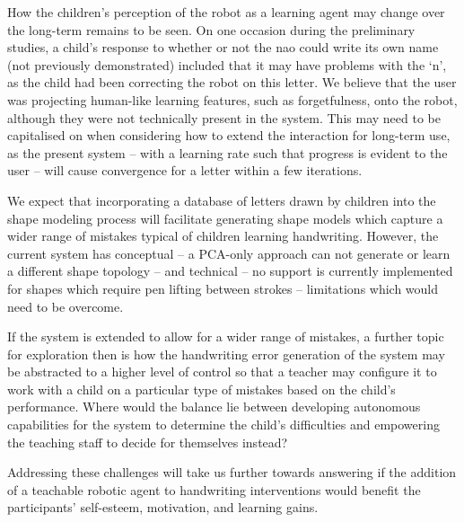 \documentclass{sig-alternate}
\begin{document}
How the children's perception of the robot as a learning agent may change over
the long-term remains to be seen. On one occasion during the preliminary
studies, a child's response to whether or not the {\sc nao} could write its own
name (not previously demonstrated) included that it may have problems with the
`n', as the child had been correcting the robot on this letter. We believe that
the user was projecting human-like learning features, such as forgetfulness,
onto the robot, although they were not technically present in the system.  This
may need to be capitalised on when considering how to extend the interaction for
long-term use, as the present system -- with a learning rate such that progress
is evident to the user -- will cause convergence for a letter within a few
iterations.

We expect that incorporating a database of letters drawn by children into the
shape modeling process will facilitate generating shape models which capture a
wider range of mistakes typical of children learning handwriting. However, the
current system has conceptual -- a PCA-only approach can not generate or learn a
different shape topology -- and technical -- no support is currently implemented
for shapes which require pen lifting between strokes -- limitations which would
need to be overcome.

If the system is extended to allow for a wider range of mistakes, a further
topic for exploration then is how the handwriting error generation of the system
may be abstracted to a higher level of control so that a teacher may configure
it to work with a child on a particular type of mistakes based on the child's
performance. Where would the balance lie between developing autonomous
capabilities for the system to determine the child's difficulties and empowering
the teaching staff to decide for themselves instead? 

Addressing these challenges will take us further towards answering if the
addition of a teachable robotic agent to handwriting interventions would benefit
the participants' self-esteem, motivation, and learning gains.


%
\end{document}
